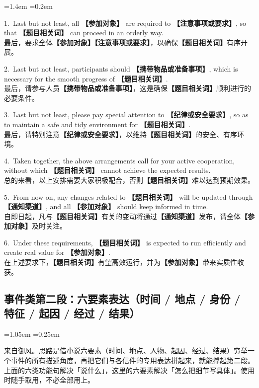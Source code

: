 \documentclass[11pt,a4paper]{ctexart}
\newcommand{\fillin}[1]{{\bfseries【#1】}}
\newenvironment{note}{%
  \par\addvspace{5pt}%
  \begin{list}{}{\leftmargin=1.05em \rightmargin=0.25em \listparindent=0pt
    \itemindent=0pt \topsep=0pt \parsep=2pt \itemsep=2pt \partopsep=0pt}%
  \item\relax\small\color{ink}%
}{%
  \end{list}\addvspace{5pt}%
}
\newenvironment{eg}{%
  \par\addvspace{4pt}%
  \begin{list}{}{\leftmargin=1.4em \rightmargin=0.2em \listparindent=0pt
    \itemindent=0pt \topsep=0pt \parsep=2pt \itemsep=2pt \partopsep=0pt}%
  \item\relax
}{%
  \end{list}\addvspace{5pt}%
}
\begin{document}
\begin{eg}
1.\ Last but not least, all \fillin{参加对象} are required to \fillin{注意事项或要求}, so that \fillin{题目相关词} can proceed in an orderly way.\\
最后，要求全体\fillin{参加对象}\fillin{注意事项或要求}，以确保\fillin{题目相关词}有序开展。

2.\ Last but not least, participants should \fillin{携带物品或准备事项}, which is necessary for the smooth progress of \fillin{题目相关词}.\\
最后，请参与人员\fillin{携带物品或准备事项}，这是确保\fillin{题目相关词}顺利进行的必要条件。

3.\ Last but not least, please pay special attention to \fillin{纪律或安全要求}, so as to maintain a safe and tidy environment for \fillin{题目相关词}.\\
最后，请特别注意\fillin{纪律或安全要求}，以维持\fillin{题目相关词}的安全、有序环境。

4.\ Taken together, the above arrangements call for your active cooperation, without which \fillin{题目相关词} cannot achieve the expected results.\\
总的来看，以上安排需要大家积极配合，否则\fillin{题目相关词}难以达到预期效果。

5.\ From now on, any changes related to \fillin{题目相关词} will be updated through \fillin{通知渠道}, and all \fillin{参加对象} should keep informed in time.\\
自即日起，凡与\fillin{题目相关词}有关的变动将通过\fillin{通知渠道}发布，请全体\fillin{参加对象}及时关注。

6.\ Under these requirements, \fillin{题目相关词} is expected to run efficiently and create real value for \fillin{参加对象}.\\
在上述要求下，\fillin{题目相关词}有望高效运行，并为\fillin{参加对象}带来实质性收获。
\end{eg}


\subsection{事件类第二段：六要素表达（时间 / 地点 / 身份 / 特征 / 起因 / 经过 / 结果）}

\begin{note}
来自御风。思路是借小说六要素（时间、地点、人物、起因、经过、结果）穷举一个事件的所有描述角度，再把它们与各信件的专用表达拼起来，就能撑起第二段。上面的六类功能句解决「说什么」，这里的六要素解决「怎么把细节写具体」。使用时随手取用，不必全部用上。
\end{note}
\end{document}
